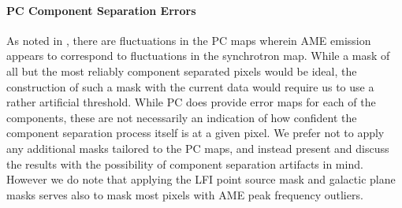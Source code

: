      \paragraph{PC Component Separation Errors}
        As noted in \cite{planck15X, hensley16}, there are fluctuations in the PC maps wherein AME emission appears to correspond to fluctuations in the synchrotron map. While a mask of all but the most reliably component separated pixels would be ideal, the construction of such a mask with the current data would require us to use a rather artificial threshold. While PC does provide error maps for each of the components, these are not necessarily an indication of how confident the component separation process itself is at a given pixel. We prefer not to apply any additional masks tailored to the PC maps, and instead present and discuss the results with the possibility of component separation artifacts in mind. However we do note that applying the LFI point source mask and galactic plane masks serves also to mask most pixels with AME peak frequency outliers.

